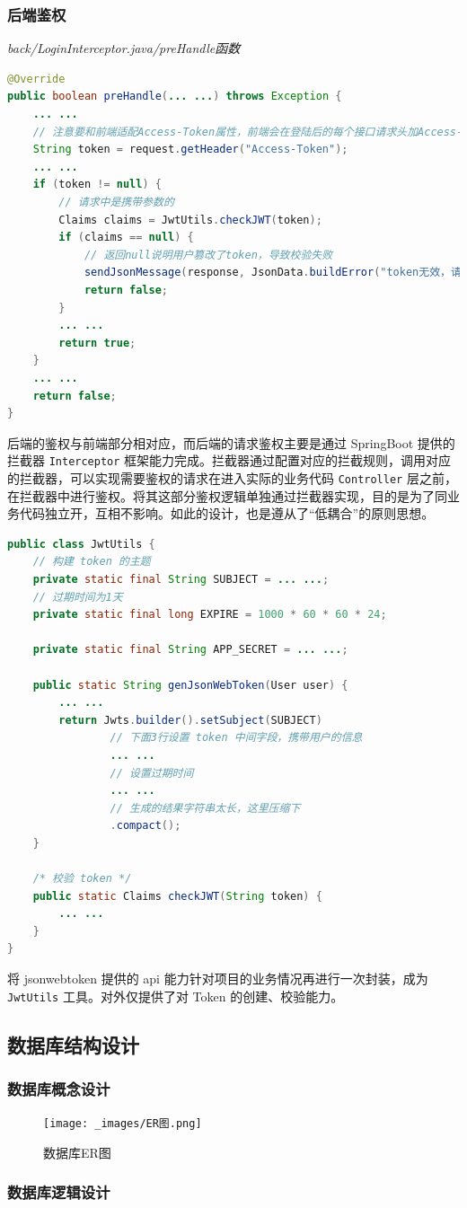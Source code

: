 \subsubsection{后端鉴权}
\noindent\textit{back/LoginInterceptor.java/preHandle函数}
\begin{lstlisting}[language=Java]
@Override
public boolean preHandle(... ...) throws Exception {
    ... ...
    // 注意要和前端适配Access-Token属性，前端会在登陆后的每个接口请求头加Access-Token属性
    String token = request.getHeader("Access-Token");
    ... ...
    if (token != null) {
        // 请求中是携带参数的
        Claims claims = JwtUtils.checkJWT(token);
        if (claims == null) {
            // 返回null说明用户篡改了token，导致校验失败
            sendJsonMessage(response, JsonData.buildError("token无效，请重新登录"));
            return false;
        }
        ... ...
        return true;
    }
    ... ...
    return false;
}
\end{lstlisting}
后端的鉴权与前端部分相对应，而后端的请求鉴权主要是通过 SpringBoot 提供的拦截器 \lstinline!Interceptor! 框架能力完成。拦截器通过配置对应的拦截规则，调用对应的拦截器，可以实现需要鉴权的请求在进入实际的业务代码 \lstinline!Controller! 层之前，在拦截器中进行鉴权。将其这部分鉴权逻辑单独通过拦截器实现，目的是为了同业务代码独立开，互相不影响。如此的设计，也是遵从了“低耦合”的原则思想。
\begin{lstlisting}[language=Java]
public class JwtUtils {
    // 构建 token 的主题
    private static final String SUBJECT = ... ...;
    // 过期时间为1天
    private static final long EXPIRE = 1000 * 60 * 60 * 24;

    private static final String APP_SECRET = ... ...;

    public static String genJsonWebToken(User user) {
        ... ...
        return Jwts.builder().setSubject(SUBJECT)
                // 下面3行设置 token 中间字段，携带用户的信息
                ... ...
                // 设置过期时间
                ... ...
                // 生成的结果字符串太长，这里压缩下
                .compact();
    }

    /* 校验 token */
    public static Claims checkJWT(String token) {
        ... ...
    }
}
\end{lstlisting}

将 jsonwebtoken 提供的 api 能力针对项目的业务情况再进行一次封装，成为 \lstinline!JwtUtils! 工具。对外仅提供了对 Token 的创建、校验能力。

\subsection{数据库结构设计}
\subsubsection{数据库概念设计}
\begin{figure}[htb]
    \centering
    \texttt{[image: \_images/ER图.png]}
    \caption{数据库ER图}
\end{figure}

\subsubsection{数据库逻辑设计}
